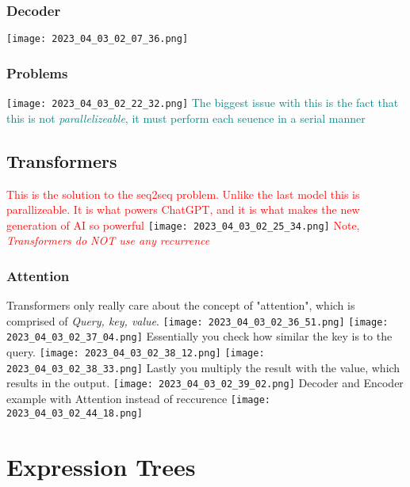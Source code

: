 \documentclass[main.tex,fontsize=8pt,paper=a4,paper=portrait,DIV=calc,]{scrartcl}
\begin{document}
\subsubsection{Decoder}
\texttt{[image: 2023\_04\_03\_02\_07\_36.png]}

\subsubsection{Problems}
\texttt{[image: 2023\_04\_03\_02\_22\_32.png]}\newline
\textcolor{teal}{The biggest issue with this is the fact that this is not \emph{parallelizeable}, it must perform each seuence in a serial manner}

\subsection{Transformers}
\textcolor{red}{This is the solution to the seq2seq problem. Unlike the last model this is parallizeable. \newline
It is what powers ChatGPT, and it is what makes the new generation of AI so powerful}\newline
\texttt{[image: 2023\_04\_03\_02\_25\_34.png]}\newline
\textcolor{red}{Note, \emph{Transformers do NOT use any recurrence}}

\subsubsection{Attention}
Transformers only really care about the concept of "attention", which is comprised of \emph{Query, key, value}.\newline
\texttt{[image: 2023\_04\_03\_02\_36\_51.png]}\newline
\texttt{[image: 2023\_04\_03\_02\_37\_04.png]}\newline
Essentially you check how similar the key is to the query.\newline
\texttt{[image: 2023\_04\_03\_02\_38\_12.png]}\newline
\texttt{[image: 2023\_04\_03\_02\_38\_33.png]}\newline
Lastly you multiply the result with the value, which results in the output.\newline
\texttt{[image: 2023\_04\_03\_02\_39\_02.png]}\newline
Decoder and Encoder example with Attention instead of reccurence\newline
\texttt{[image: 2023\_04\_03\_02\_44\_18.png]}

\section{Expression Trees}
\end{document}
